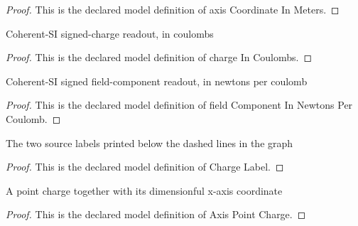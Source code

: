 \begin{proof}
  This is the declared model definition of axis Coordinate In Meters.
\end{proof}
\begin{definition}
  \label{def:physics:phyx-mini-0861:phyxminiproblems-problemphyxmini0861-chargeincoulombs}
  Coherent-SI signed-charge readout, in coulombs
\end{definition}
\begin{proof}
  This is the declared model definition of charge In Coulombs.
\end{proof}
\begin{definition}
  \label{def:physics:phyx-mini-0861:phyxminiproblems-problemphyxmini0861-fieldcomponentinnewtonspercoulomb}
  Coherent-SI signed field-component readout, in newtons per coulomb
\end{definition}
\begin{proof}
  This is the declared model definition of field Component In Newtons Per Coulomb.
\end{proof}
\begin{definition}
  \label{def:physics:phyx-mini-0861:phyxminiproblems-problemphyxmini0861-chargelabel}
  The two source labels printed below the dashed lines in the graph
\end{definition}
\begin{proof}
  This is the declared model definition of Charge Label.
\end{proof}
\begin{definition}
  \label{def:physics:phyx-mini-0861:phyxminiproblems-problemphyxmini0861-axispointcharge}
  A point charge together with its dimensionful x-axis coordinate
\end{definition}
\begin{proof}
  This is the declared model definition of Axis Point Charge.
\end{proof}
